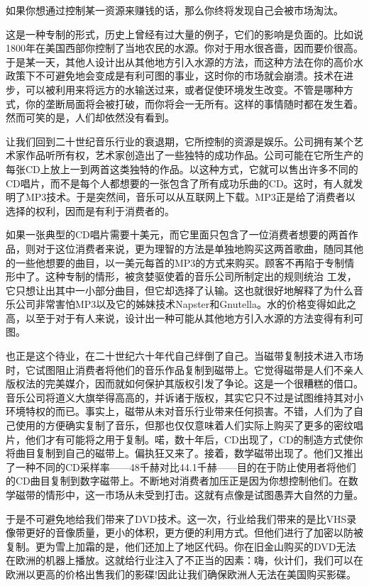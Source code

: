 如果你想通过控制某一资源来赚钱的话，那么你终将发现自己会被市场淘汰。

这是一种专制的形式，历史上曾经有过大量的例子，它们的影响是负面的。比如说1800年在美国西部你控制了当地农民的水源。你对于用水很吝啬，因而要价很高。于是某一天，其他人设计出从其他地方引入水源的方法，而这种方法在你的高价水政策下不可避免地会变成是有利可图的事业，这时你的市场就会崩溃。技术在进步，可以被利用来将远方的水输送过来，或者促使环境发生改变。不管是哪种方式，你的垄断局面将会被打破，而你将会一无所有。这样的事情随时都在发生着。然而可笑的是，人们却依然没有看到。

让我们回到二十世纪音乐行业的衰退期，它所控制的资源是娱乐。公司拥有某个艺术家作品听所有权，艺术家创造出了一些独特的成功作品。公司可能在它所生产的每张CD上放上一到两首这类独特的作品。以这种方式，它就可以售出许多不同的CD唱片，而不是每个人都想要的一张包含了所有成功乐曲的CD。这时，有人就发明了MP3技术。于是突然间，音乐可以从互联网上下载。MP3正是给了消费者以选择的权利，因而是有利于消费者的。

如果一张典型的CD唱片需要十美元，而它里面只包含了一位消费者想要的两首作品，则对于这位消费者来说，更为理智的方法是单独地购买这两首歌曲，随同其他的一些他想要的曲目，以一美元每首的MP3的方式来购买。顾客不再陷于专制情形中了。这种专制的情形，被贪婪驱使着的音乐公司所制定出的规则统治 工发，它只想让出其中一小部分曲目，但它却选择了认输。这也就很好地解释了为什么音乐公司非常害怕MP3以及它的姊妹技术Napster和Gnutella。水的价格变得如此之高，以至于对于有人来说，设计出一种可能从其他地方引入水源的方法变得有利可图。

也正是这个待业，在二十世纪六十年代自己绊倒了自己。当磁带复制技术进入市场时，它试图阻止消费者将他们的音乐作品复制到磁带上。它觉得磁带是人们不亲人版权法的完美媒介，因而就如何保护其版权引发了争论。这是一个很糟糕的借口。音乐公司将道义大旗举得高高的，并诉诸于版权，其实它只不过是试图维持其对小环境特权的而已。事实上，磁带从未对音乐行业带来任何损害。不错，人们为了自己使用的方便确实复制了音乐，但那也仅仅意味着人们实际上购买了更多的密纹唱片，他们才有可能将之用于复制。喏，数十年后，CD出现了，CD的制造方式使你将曲目复制到自己的磁带上。偏执狂又来了。接着，数学磁带出现了。他们又推出了一种不同的CD采样率——48千赫对比44.1千赫——目的在于防止使用者将他们的CD曲目复制到数字磁带上。不断地对消费者加压正是因为你想控制他们。在数学磁带的情形中，这一市场从未受到打击。这就有点像是试图愚弄大自然的力量。

于是不可避免地给我们带来了DVD技术。这一次，行业给我们带来的是比VHS录像带更好的音像质量，更小的体积，更方便的利用方式。但他们进行了加密以防被复制。更为雪上加霜的是，他们还加上了地区代码。你在旧金山购买的DVD无法在欧洲的机器上播放。这就给行业注入了不正当的因素：嗨，伙计们，我们可以在欧洲以更高的价格出售我们的影碟!因此让我们确保欧洲人无法在美国购买影碟。

